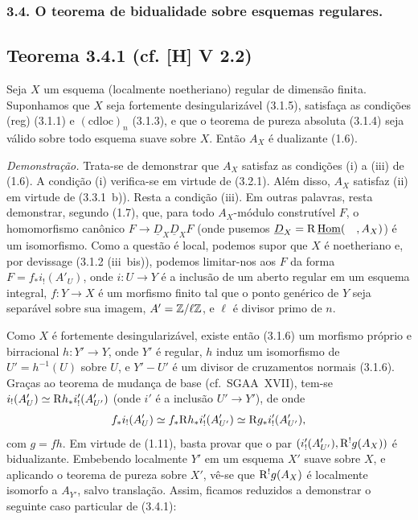 \subsubsection*{3.4. O teorema de bidualidade sobre esquemas regulares.}

\subsection*{Teorema 3.4.1 (cf. [H] V 2.2)}
Seja $X$ um esquema (localmente noetheriano) regular de dimensão finita. Suponhamos que $X$ seja fortemente desingularizável (3.1.5), satisfaça as condições (reg) (3.1.1) e $(\mathrm{cdloc})_n$ (3.1.3), e que o teorema de pureza absoluta (3.1.4) seja válido sobre todo esquema suave sobre $X$. Então $A_X$ é dualizante (1.6).

\emph{Demonstração.} Trata-se de demonstrar que $A_X$ satisfaz as condições (i) a (iii) de (1.6). A condição (i) verifica-se em virtude de (3.2.1). Além disso, $A_X$ satisfaz (ii) em virtude de (3.3.1~b)). Resta a condição (iii). Em outras palavras, resta demonstrar, segundo (1.7), que, para todo $A_X$-módulo construtível $F$, o homomorfismo canônico $F \to \underline{D}_X \underline{D}_X F$ (onde pusemos $\underline{D}_X = \mathrm{R}\,\underline{\operatorname{Hom}}(\quad, A_X)$) é um isomorfismo. Como a questão é local, podemos supor que $X$ é noetheriano e, por devissage (3.1.2 (iii~bis)), podemos limitar-nos aos $F$ da forma $F = f_{*}i_{!}(A'_U)$, onde $i : U \to Y$ é a inclusão de um aberto regular em um esquema integral, $f : Y \to X$ é um morfismo finito tal que o ponto genérico de $Y$ seja separável sobre sua imagem, $A' = \mathbb{Z}/\ell\mathbb{Z}$, e $\ell$ é divisor primo de $n$.

Como $X$ é fortemente desingularizável, existe então (3.1.6) um morfismo próprio e birracional $h : Y' \to Y$, onde $Y'$ é regular, $h$ induz um isomorfismo de $U' = h^{-1}(U)$ sobre $U$, e $Y' - U'$ é um divisor de cruzamentos normais (3.1.6). Graças ao teorema de mudança de base (cf.~SGAA~XVII), tem-se $i_{!}(A'_U) \simeq \mathrm{R} h_{*} i'_{!}(A'_{U'})$ (onde $i'$ é a inclusão $U' \to Y'$), de onde
\[
f_{*} i_{!}(A'_U) \simeq f_{*} \mathrm{R} h_{*} i'_{!}(A'_{U'}) \simeq \mathrm{R} g_{*} i'_{!}(A'_{U'}),
\]
com $g = fh$. Em virtude de (1.11), basta provar que o par $(i'_{!}(A'_{U'}), \mathrm{R}^{!}g(A_X))$ é bidualizante. Embebendo localmente $Y'$ em um esquema $X'$ suave sobre $X$, e aplicando o teorema de pureza sobre $X'$, vê-se que $\mathrm{R}^{!}g(A_X)$ é localmente isomorfo a $A_{Y'}$, salvo translação. Assim, ficamos reduzidos a demonstrar o seguinte caso particular de (3.4.1):

